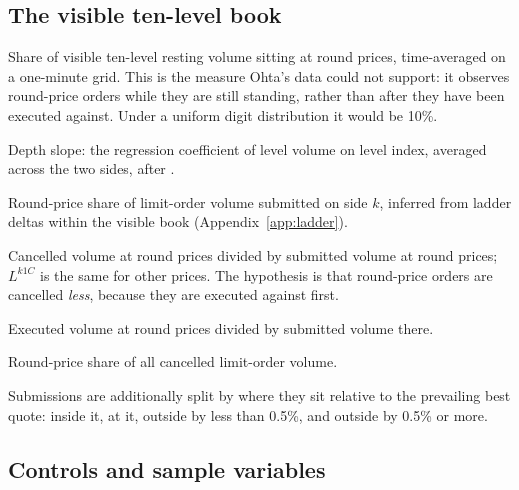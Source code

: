 \subsection*{The visible ten-level book}

\begin{description}[leftmargin=6.5em, style=nextline, nosep, font=\normalfont\itshape]
\item[$\mathit{RDepth}^{\mathrm{ask}0}, \mathit{RDepth}^{\mathrm{bid}0}$] Share of
  visible ten-level resting volume sitting at round prices, time-averaged on a
  one-minute grid. This is the measure Ohta's data could not support: it observes
  round-price orders while they are still standing, rather than after they have
  been executed against. Under a uniform digit distribution it would be 10\%.
\item[$\mathit{Slope}$] Depth slope: the regression coefficient of level volume on
  level index, averaged across the two sides, after
  \textcite{NaesSkjeltorp2006}.
\item[$L^{k0}$] Round-price share of limit-order volume submitted on side $k$,
  inferred from ladder deltas within the visible book
  (Appendix~\ref{app:ladder}).
\item[$L^{k0C}$] Cancelled volume at round prices divided by submitted volume at
  round prices; $L^{k1C}$ is the same for other prices. The hypothesis is that
  round-price orders are cancelled \emph{less}, because they are executed against
  first.
\item[$L^{k0E}$] Executed volume at round prices divided by submitted volume
  there.
\item[$C^{k0}$] Round-price share of all cancelled limit-order volume.
\item[distance classes] Submissions are additionally split by where they sit
  relative to the prevailing best quote: inside it, at it, outside by less than
  0.5\%, and outside by 0.5\% or more.
\end{description}

\subsection*{Controls and sample variables}

